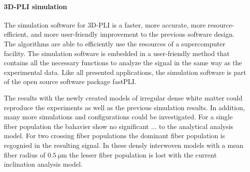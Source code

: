 \paragraph{\acs{3D-PLI} simulation} %
The simulation software for \ac{3D-PLI} is a faster, more accurate, more resource-efficient, and more user-friendly improvement to the previous software design.
The algorithms are able to efficiently use the resources of a supercomputer facility.
The simulation software is embedded in a user-friendly \python{} method that contains all the necessary functions to analyze the signal in the same way as the experimental data.
Like all presented applications, the simulation software is part of the open source software package \ac{fastPLI}.
\par
% 
The results with the newly created models of irregular dense white matter could reproduce the experiments as well as the previous simulation results.
In addition, many more simulations and configurations could be investigated.
For a single fiber population the bahavier show no significant ... to the analytical analysis model.
For two crossing fiber populations the dominant fiber population is regognied in the resulting signal.
In these densly interwoven models with a mean fiber radius of $\SI{0.5}{\micro\meter}$ the lesser fiber population is lost with the current inclination analysis model.
\par
%
